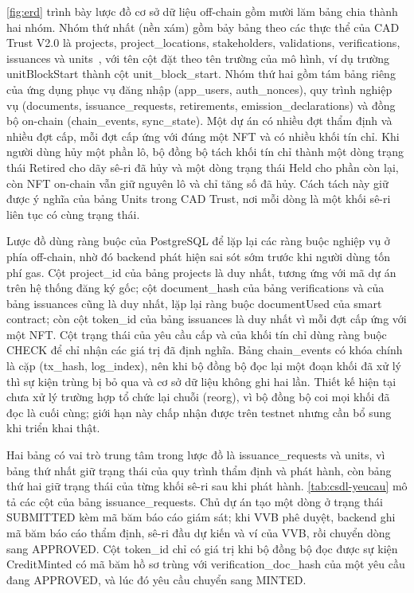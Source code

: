 \autoref{fig:erd} trình bày lược đồ cơ sở dữ liệu off-chain gồm mười lăm bảng chia thành hai nhóm. Nhóm thứ nhất (nền xám) gồm bảy bảng theo các thực thể của CAD Trust V2.0 là projects, project\_locations, stakeholders, validations, verifications, issuances và units~\cite{cadtrust2025datamodel}, với tên cột đặt theo tên trường của mô hình, ví dụ trường unitBlockStart thành cột unit\_block\_start. Nhóm thứ hai gồm tám bảng riêng của ứng dụng phục vụ đăng nhập (app\_users, auth\_nonces), quy trình nghiệp vụ (documents, issuance\_requests, retirements, emission\_declarations) và đồng bộ on-chain (chain\_events, sync\_state). Một dự án có nhiều đợt thẩm định và nhiều đợt cấp, mỗi đợt cấp ứng với đúng một NFT và có nhiều khối tín chỉ. Khi người dùng hủy một phần lô, bộ đồng bộ tách khối tín chỉ thành một dòng trạng thái Retired cho dãy sê-ri đã hủy và một dòng trạng thái Held cho phần còn lại, còn NFT on-chain vẫn giữ nguyên lô và chỉ tăng số đã hủy. Cách tách này giữ được ý nghĩa của bảng Units trong CAD Trust, nơi mỗi dòng là một khối sê-ri liên tục có cùng trạng thái.

\HinhERD

Lược đồ dùng ràng buộc của PostgreSQL để lặp lại các ràng buộc nghiệp vụ ở phía off-chain, nhờ đó backend phát hiện sai sót sớm trước khi người dùng tốn phí gas. Cột project\_id của bảng projects là duy nhất, tương ứng với mã dự án trên hệ thống đăng ký gốc; cột document\_hash của bảng verifications và của bảng issuances cũng là duy nhất, lặp lại ràng buộc documentUsed của smart contract; còn cột token\_id của bảng issuances là duy nhất vì mỗi đợt cấp ứng với một NFT. Cột trạng thái của yêu cầu cấp và của khối tín chỉ dùng ràng buộc CHECK để chỉ nhận các giá trị đã định nghĩa. Bảng chain\_events có khóa chính là cặp (tx\_hash, log\_index), nên khi bộ đồng bộ đọc lại một đoạn khối đã xử lý thì sự kiện trùng bị bỏ qua và cơ sở dữ liệu không ghi hai lần. Thiết kế hiện tại chưa xử lý trường hợp tổ chức lại chuỗi (reorg), vì bộ đồng bộ coi mọi khối đã đọc là cuối cùng; giới hạn này chấp nhận được trên testnet nhưng cần bổ sung khi triển khai thật.

Hai bảng có vai trò trung tâm trong lược đồ là issuance\_requests và units, vì bảng thứ nhất giữ trạng thái của quy trình thẩm định và phát hành, còn bảng thứ hai giữ trạng thái của từng khối sê-ri sau khi phát hành. \autoref{tab:csdl-yeucau} mô tả các cột của bảng issuance\_requests. Chủ dự án tạo một dòng ở trạng thái SUBMITTED kèm mã băm báo cáo giám sát; khi VVB phê duyệt, backend ghi mã băm báo cáo thẩm định, sê-ri đầu dự kiến và ví của VVB, rồi chuyển dòng sang APPROVED. Cột token\_id chỉ có giá trị khi bộ đồng bộ đọc được sự kiện CreditMinted có mã băm hồ sơ trùng với verification\_doc\_hash của một yêu cầu đang APPROVED, và lúc đó yêu cầu chuyển sang MINTED.

